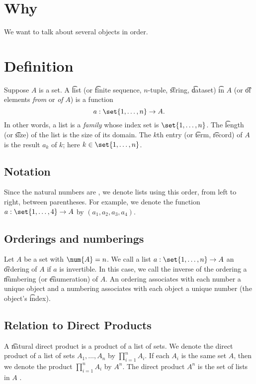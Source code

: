 
\section*{Why}

We want to talk about several objects in order.

\section*{Definition}

Suppose $A$ is a set.
A \t{list} (or \t{finite sequence}, \t{$n$-tuple}, \t{string}, \t{dataset}) \t{in} $A$ (or \t{of} elements \textit{from} or \textit{of} $A$) is a function
\[
a: \set{1, \dots , n} \to A.
\]
In other words, a list is a \textit{family} whose index set is $\set{1, \dots , n}$.
The \t{length} (or \t{size}) of the list is the size of its domain.
The \t{$k$th entry} (or \t{term}, \t{record}) of $A$ is the result $a_k$ of $k$; here $k \in \set{1, \dots , n}$.

\subsection*{Notation}

Since the natural numbers are , we denote lists using this order, from left to right, between parentheses.
For example, we denote the function $a: \set{1, \dots , 4} \to A$ by $(a_1, a_2, a_3, a_4)$.

\subsection*{Orderings and numberings}

Let $A$ be a set with $\num{A} = n$.
We call a list $a: \set{1, \dots , n} \to A$ an \t{ordering} of $A$ if $a$ is invertible.
In this case, we call the inverse of the ordering a \t{numbering} (or \t{enumeration}) of $A$.
An ordering associates with each number a unique object and a numbering associates with each object a unique number (the object's \t{index}).

\subsection*{Relation to Direct Products}

A \t{natural direct product} is a product of a list of sets.
We denote the direct product of a list of sets $A_1, \dots , A_n$ by $\prod_{i = 1}^{n} A_i$.
If each $A_i$ is the same set $A$, then we denote the product $\prod_{i = 1}^{n} A_i$ by $A^n$.
The direct product $A^n$ is the set of lists in $A$ .

